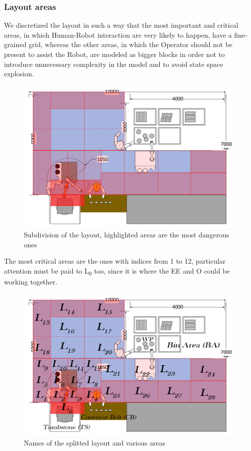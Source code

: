 \documentclass[a4paper]{article}
\begin{document}
\subsubsection{Layout areas}
We discretized the layout in such a way that the most important and critical areas, in which Human-Robot interaction are very likely to happen, have a fine-grained grid, whereas the other areas, in which the Operator should not be present to assist the Robot, are modeled as bigger blocks in order not to introduce unnecessary complexity in the model and to avoid state space explosion.
\begin{figure}[htp] 
\includegraphics[width=\textwidth]{images/layout} 
\caption{Subdivision of the layout, highlighted areas are the most dangerous ones} 
\label{fig:layout} 
\end{figure}

\clearpage
The most critical areas are the ones with indices from 1 to 12, particular attention must be paid to L\textsubscript0 too, since it is where the EE and O could be working together. 

\begin{figure}[htp] 
\includegraphics[width=\textwidth]{images/layoutnames} 
\caption{Names of the splitted layout and various areas} 
\label{fig:layout} 
\end{figure}
\end{document}
